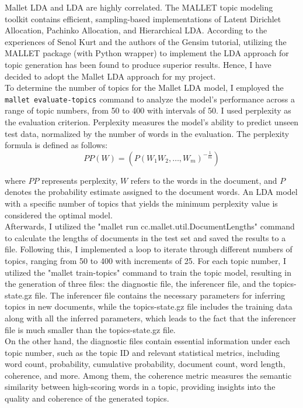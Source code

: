 \documentclass[12pt,twoside]{report}
\begin{document}
Mallet LDA and LDA are highly correlated. The MALLET topic modeling toolkit contains efficient, sampling-based implementations of Latent Dirichlet Allocation, Pachinko Allocation, and Hierarchical LDA. \cite{mallet} According to the experiences of Senol Kurt and the authors of the Gensim tutorial, utilizing the MALLET package (with Python wrapper) to implement the LDA approach for topic generation has been found to produce superior results.\cite{kurt2020topic} Hence, I have decided to adopt the Mallet LDA approach for my project.\\

To determine the number of topics for the Mallet LDA model, I employed the \texttt{mallet evaluate-topics} command to analyze the model's performance across a range of topic numbers, from 50 to 400 with intervals of 50. I used perplexity as the evaluation criterion. Perplexity measures the model's ability to predict unseen test data, normalized by the number of words in the evaluation. The perplexity formula is defined as follows:
\begin{equation}
PP(W) = \left( P(W_1W_2, \ldots, W_m)^{-\frac{1}{m}} \right)
\end{equation}

where $PP$ represents perplexity, $W$ refers to the words in the document, and $P$ denotes the probability estimate assigned to the document words. An LDA model with a specific number of topics that yields the minimum perplexity value is considered the optimal model.\cite{neishabouri2020reliability} \\

Afterwards, I utilized the "mallet run cc.mallet.util.DocumentLengths" command to calculate the lengths of documents in the test set and saved the results to a file. Following this, I implemented a loop to iterate through different numbers of topics, ranging from 50 to 400 with increments of 25. For each topic number, I utilized the "mallet train-topics" command to train the topic model, resulting in the generation of three files: the diagnostic file, the inferencer file, and the topics-state.gz file. The inferencer file contains the necessary parameters for inferring topics in new documents, while the topics-state.gz file includes the training data along with all the inferred parameters, which leads to the fact that the inferencer file is much smaller than the topics-state.gz file.\\

On the other hand, the diagnostic files contain essential information under each topic number, such as the topic ID and relevant statistical metrics, including word count, probability, cumulative probability, document count, word length, coherence, and more. Among them, the coherence metric measures the semantic similarity between high-scoring words in a topic, providing insights into the quality and coherence of the generated topics.\cite{kapadia2022evaluate}\\
\end{document}
